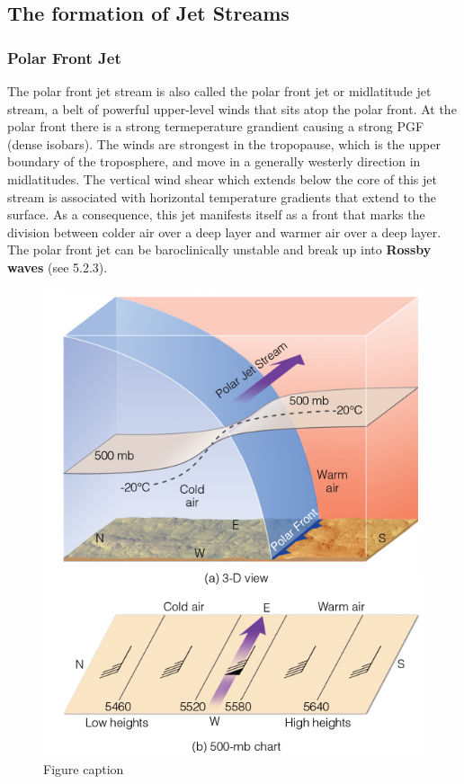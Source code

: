 \documentclass[12pt,oneside]{book}
\begin{document}
\subsection{The formation of Jet
Streams}\label{the-formation-of-jet-streams}

\subsubsection{Polar Front Jet}\label{polar-front-jet}

The polar front jet stream is also called the polar front jet or
midlatitude jet stream, a belt of powerful upper-level winds that sits
atop the polar front. At the polar front there is a strong termeperature
grandient causing a strong PGF (dense isobars). The winds are strongest
in the tropopause, which is the upper boundary of the troposphere, and
move in a generally westerly direction in midlatitudes. The vertical
wind shear which extends below the core of this jet stream is associated
with horizontal temperature gradients that extend to the surface. As a
consequence, this jet manifests itself as a front that marks the
division between colder air over a deep layer and warmer air over a deep
layer. The polar front jet can be baroclinically unstable and break up
into \textbf{Rossby waves} (see 5.2.3).

\begin{figure}
\includegraphics[width=0.8\linewidth]{figures/Figure522a} \caption{Figure caption}\label{fig:Fig522a}
\end{figure}
\end{document}
